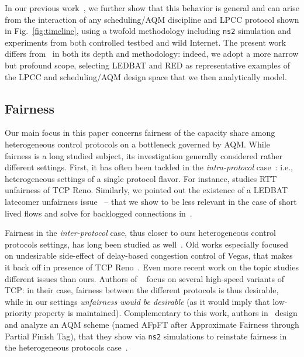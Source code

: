 \documentclass[conference]{IEEEtran}
\newcommand{\figR}[1]{Fig.~\ref{fig:#1}}
\begin{document}
In our previous work~\cite{tma13}, we further show that this behavior is general and can arise from the interaction of any scheduling/AQM discipline and LPCC protocol shown in \figR{timeline}, using a twofold methodology including \verb!ns2! simulation and experiments from both controlled testbed and wild Internet. The present work differs from~\cite{tma13} in both its depth and methodology: indeed, we adopt a more narrow but profound scope, selecting LEDBAT and RED as representative examples of the LPCC and scheduling/AQM design space that we then analytically model.

 
\subsection{Fairness}

Our main focus in this paper concerns fairness of the capacity share among heterogeneous control protocols on a bottleneck governed by AQM. While fairness is a long studied subject, its investigation generally considered rather different settings. First, it has often been tackled in the \emph{intra-protocol} case~\cite{floyd91sigcomm,icccn10,globecom10,tr10}: i.e., heterogeneous settings of a single protocol flavor. For instance, \cite{floyd91sigcomm} studies RTT unfairness of TCP Reno. Similarly, we pointed out the existence of a LEDBAT latecomer unfairness issue~\cite{icccn10} -- that we show to be less  relevant in the case of short lived flows and solve for backlogged 
connections in~\cite{globecom10,tr10}.

Fairness in the \emph{inter-protocol} case, thus closer to ours heterogeneous control protocols settings, has long been studied as well~\cite{ahn95sigcomm,eshete12aintec,eshete23itc}.
Old works especially focused on undesirable side-effect of delay-based congestion control of Vegas, that makes it back off in presence of TCP Reno~\cite{ahn95sigcomm}. Even more recent work on the topic studies different issues than ours. Authors of ~\cite{eshete12aintec,eshete23itc} focus on several high-speed variants of TCP: in their case, fairness between the different protocols is thus desirable, while in our settings \emph{unfairness would be desirable} (as it would imply that low-priority property is maintained). 
Complementary to this work, authors in~\cite{eshete23itc} design and analyze an AQM scheme (named AFpFT after Approximate Fairness through Partial Finish Tag), that they show via \verb!ns2! simulations to reinstate fairness in the heterogeneous protocols case~\cite{eshete12aintec}.
\end{document}
